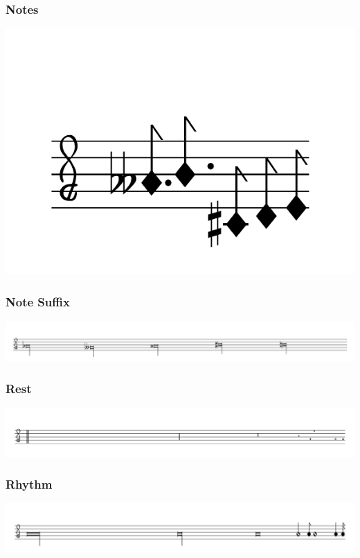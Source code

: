 \documentclass{article}
\begin{document}
    \subsubsection{Notes}
        \includegraphics[scale=0.5]{figures_tests/pdf/smens/note1.pdf}

    \subsubsection{Note Suffix}
        \includegraphics[scale=0.28]{figures_tests/pdf/smens/notesufix.pdf}

    \subsubsection{Rest}
        \includegraphics[scale=0.3]{figures_tests/pdf/smens/rest1.pdf}

    \subsubsection{Rhythm}
        \includegraphics[scale=0.3]{figures_tests/pdf/smens/rhythm1.pdf}
\end{document}

